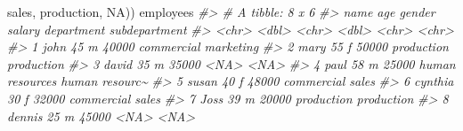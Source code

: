 \documentclass[
]{book}
\newenvironment{Shaded}{\begin{snugshade}}{\end{snugshade}}
\newcommand{\CommentTok}[1]{\textcolor[rgb]{0.56,0.35,0.01}{\textit{#1}}}
\newcommand{\ConstantTok}[1]{\textcolor[rgb]{0.00,0.00,0.00}{#1}}
\newcommand{\NormalTok}[1]{#1}
\newcommand{\StringTok}[1]{\textcolor[rgb]{0.31,0.60,0.02}{#1}}
\begin{document}
\begin{Shaded}
\begin{Highlighting}[]
                      \StringTok{\textquotesingle{}sales\textquotesingle{}}\NormalTok{, }\StringTok{\textquotesingle{}production\textquotesingle{}}\NormalTok{, }\ConstantTok{NA}\NormalTok{))}
\NormalTok{employees}
\CommentTok{\#\textgreater{} \# A tibble: 8 x 6}
\CommentTok{\#\textgreater{}   name      age gender salary department      subdepartment }
\CommentTok{\#\textgreater{}   \textless{}chr\textgreater{}   \textless{}dbl\textgreater{} \textless{}chr\textgreater{}   \textless{}dbl\textgreater{} \textless{}chr\textgreater{}           \textless{}chr\textgreater{}         }
\CommentTok{\#\textgreater{} 1 john       45 m       40000 commercial      marketing     }
\CommentTok{\#\textgreater{} 2 mary       55 f       50000 production      production    }
\CommentTok{\#\textgreater{} 3 david      35 m       35000 \textless{}NA\textgreater{}            \textless{}NA\textgreater{}          }
\CommentTok{\#\textgreater{} 4 paul       58 m       25000 human resources human resourc\textasciitilde{}}
\CommentTok{\#\textgreater{} 5 susan      40 f       48000 commercial      sales         }
\CommentTok{\#\textgreater{} 6 cynthia    30 f       32000 commercial      sales         }
\CommentTok{\#\textgreater{} 7 Joss       39 m       20000 production      production    }
\CommentTok{\#\textgreater{} 8 dennis     25 m       45000 \textless{}NA\textgreater{}            \textless{}NA\textgreater{}}


\end{Highlighting}
\end{Shaded}
\end{document}
